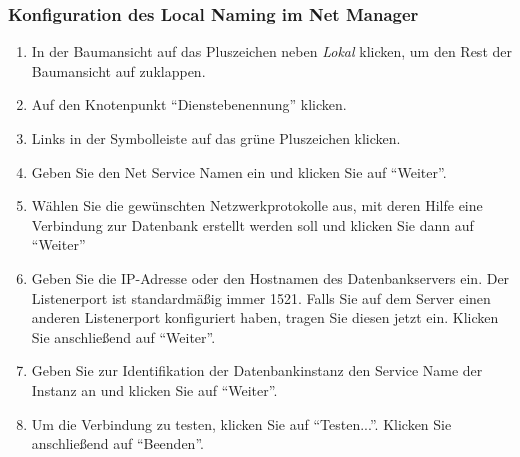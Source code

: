         \subsubsection{Konfiguration des Local Naming im Net Manager}
          \begin{enumerate}
            \item In der Baumansicht auf das Pluszeichen neben \textit{Lokal} klicken, um den Rest der Baumansicht auf zuklappen.
            \item Auf den Knotenpunkt \enquote{Dienstebenennung} klicken.
            \item Links in der Symbolleiste auf das grüne Pluszeichen klicken.
            \item Geben Sie den Net Service Namen ein und klicken Sie auf \enquote{Weiter}.
\clearpage
            \item Wählen Sie die gewünschten Netzwerkprotokolle aus, mit deren Hilfe eine Verbindung zur Datenbank erstellt werden soll und klicken Sie dann auf \enquote{Weiter}
            \item Geben Sie die IP-Adresse oder den Hostnamen des Datenbankservers ein. Der Listenerport ist standardmäßig immer 1521. Falls Sie auf dem Server einen anderen Listenerport konfiguriert haben, tragen Sie diesen jetzt ein. Klicken Sie anschließend auf \enquote{Weiter}.
\clearpage
            \item Geben Sie zur Identifikation der Datenbankinstanz den Service Name der Instanz an und klicken Sie auf \enquote{Weiter}.
            \item Um die Verbindung zu testen, klicken Sie auf \enquote{Testen...}. Klicken Sie anschließend auf \enquote{Beenden}.
\clearpage

          \end{enumerate}
